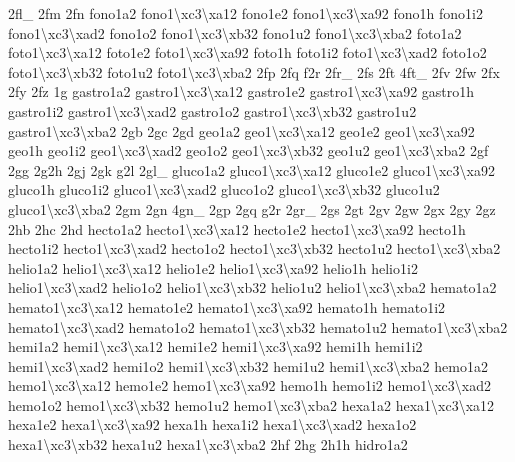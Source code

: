 \begin{DoxyCompactItemize}
2fl\-\_\- 2fm 2fn fono1a2 fono1\textbackslash{}xc3\textbackslash{}xa12 fono1e2 fono1\textbackslash{}xc3\textbackslash{}xa92 fono1h fono1i2 fono1\textbackslash{}xc3\textbackslash{}xad2 fono1o2 fono1\textbackslash{}xc3\textbackslash{}xb32 fono1u2 fono1\textbackslash{}xc3\textbackslash{}xba2 foto1a2 foto1\textbackslash{}xc3\textbackslash{}xa12 foto1e2 foto1\textbackslash{}xc3\textbackslash{}xa92 foto1h foto1i2 foto1\textbackslash{}xc3\textbackslash{}xad2 foto1o2 foto1\textbackslash{}xc3\textbackslash{}xb32 foto1u2 foto1\textbackslash{}xc3\textbackslash{}xba2 2fp 2fq f2r 2fr\-\_\- 2fs 2ft 4ft\-\_\- 2fv 2fw 2fx 2fy 2fz 1g gastro1a2 gastro1\textbackslash{}xc3\textbackslash{}xa12 gastro1e2 gastro1\textbackslash{}xc3\textbackslash{}xa92 gastro1h gastro1i2 gastro1\textbackslash{}xc3\textbackslash{}xad2 gastro1o2 gastro1\textbackslash{}xc3\textbackslash{}xb32 gastro1u2 gastro1\textbackslash{}xc3\textbackslash{}xba2 2gb 2gc 2gd geo1a2 geo1\textbackslash{}xc3\textbackslash{}xa12 geo1e2 geo1\textbackslash{}xc3\textbackslash{}xa92 geo1h geo1i2 geo1\textbackslash{}xc3\textbackslash{}xad2 geo1o2 geo1\textbackslash{}xc3\textbackslash{}xb32 geo1u2 geo1\textbackslash{}xc3\textbackslash{}xba2 2gf 2gg 2g2h 2gj 2gk g2l 2gl\-\_\- gluco1a2 gluco1\textbackslash{}xc3\textbackslash{}xa12 gluco1e2 gluco1\textbackslash{}xc3\textbackslash{}xa92 gluco1h gluco1i2 gluco1\textbackslash{}xc3\textbackslash{}xad2 gluco1o2 gluco1\textbackslash{}xc3\textbackslash{}xb32 gluco1u2 gluco1\textbackslash{}xc3\textbackslash{}xba2 2gm 2gn 4gn\-\_\- 2gp 2gq g2r 2gr\-\_\- 2gs 2gt 2gv 2gw 2gx 2gy 2gz 2hb 2hc 2hd hecto1a2 hecto1\textbackslash{}xc3\textbackslash{}xa12 hecto1e2 hecto1\textbackslash{}xc3\textbackslash{}xa92 hecto1h hecto1i2 hecto1\textbackslash{}xc3\textbackslash{}xad2 hecto1o2 hecto1\textbackslash{}xc3\textbackslash{}xb32 hecto1u2 hecto1\textbackslash{}xc3\textbackslash{}xba2 helio1a2 helio1\textbackslash{}xc3\textbackslash{}xa12 helio1e2 helio1\textbackslash{}xc3\textbackslash{}xa92 helio1h helio1i2 helio1\textbackslash{}xc3\textbackslash{}xad2 helio1o2 helio1\textbackslash{}xc3\textbackslash{}xb32 helio1u2 helio1\textbackslash{}xc3\textbackslash{}xba2 hemato1a2 hemato1\textbackslash{}xc3\textbackslash{}xa12 hemato1e2 hemato1\textbackslash{}xc3\textbackslash{}xa92 hemato1h hemato1i2 hemato1\textbackslash{}xc3\textbackslash{}xad2 hemato1o2 hemato1\textbackslash{}xc3\textbackslash{}xb32 hemato1u2 hemato1\textbackslash{}xc3\textbackslash{}xba2 hemi1a2 hemi1\textbackslash{}xc3\textbackslash{}xa12 hemi1e2 hemi1\textbackslash{}xc3\textbackslash{}xa92 hemi1h hemi1i2 hemi1\textbackslash{}xc3\textbackslash{}xad2 hemi1o2 hemi1\textbackslash{}xc3\textbackslash{}xb32 hemi1u2 hemi1\textbackslash{}xc3\textbackslash{}xba2 hemo1a2 hemo1\textbackslash{}xc3\textbackslash{}xa12 hemo1e2 hemo1\textbackslash{}xc3\textbackslash{}xa92 hemo1h hemo1i2 hemo1\textbackslash{}xc3\textbackslash{}xad2 hemo1o2 hemo1\textbackslash{}xc3\textbackslash{}xb32 hemo1u2 hemo1\textbackslash{}xc3\textbackslash{}xba2 hexa1a2 hexa1\textbackslash{}xc3\textbackslash{}xa12 hexa1e2 hexa1\textbackslash{}xc3\textbackslash{}xa92 hexa1h hexa1i2 hexa1\textbackslash{}xc3\textbackslash{}xad2 hexa1o2 hexa1\textbackslash{}xc3\textbackslash{}xb32 hexa1u2 hexa1\textbackslash{}xc3\textbackslash{}xba2 2hf 2hg 2h1h hidro1a2 
\end{DoxyCompactItemize}
